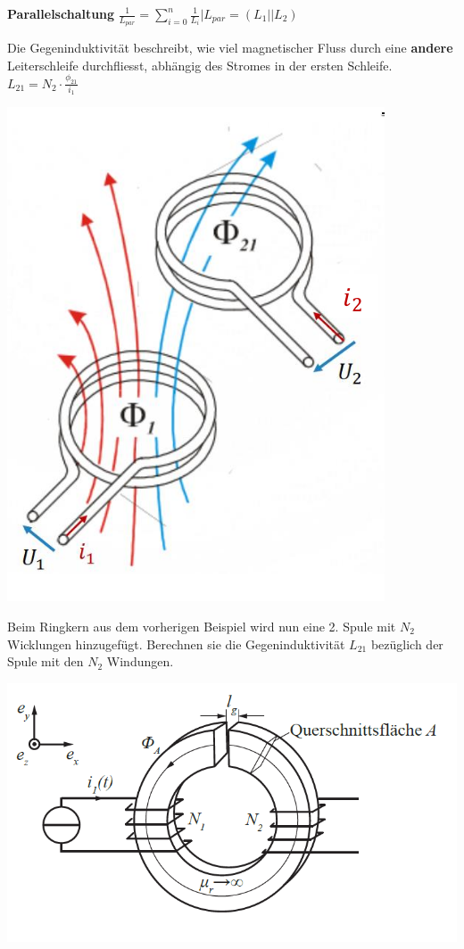 \textbf{Parallelschaltung}
\formulaBegin
$\displaystyle \frac{1}{L_{par}} = \sum_{i=0}^n \frac{1}{L_i} \Bigg\rvert L_{par} = (L_1 || L_2 )$
\formulaEnd
\iend
\newpage


\beginip
Die Gegeninduktivität beschreibt, wie viel magnetischer Fluss durch eine \textbf{andere} Leiterschleife durchfliesst, abhängig
des Stromes in der ersten Schleife.
\formulaBegin
$\displaystyle L_{21} = N_2 \cdot \frac{\phi_{21}}{i_1}$
\formulaEnd
\begin{center}

	\includegraphics[scale=0.3]{img/gegenind}
\end{center}
\iend


\beginbsp
Beim Ringkern aus dem vorherigen Beispiel wird nun eine 2. Spule mit $N_2$ Wicklungen hinzugefügt. Berechnen sie die Gegeninduktivität $L_{21}$ bezüglich der Spule mit den $N_2$ Windungen.
\begin{center}

	\includegraphics[scale=0.5]{img/induktivitaet_bsp_2.png}
\end{center}
\iend

